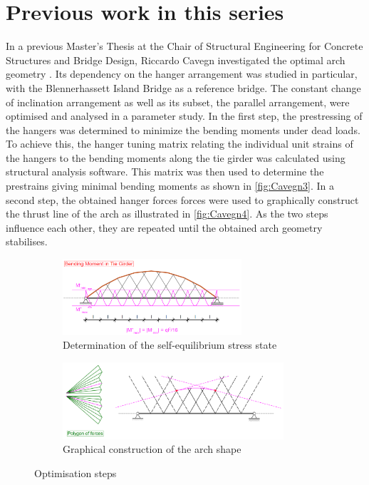 \section{Previous work in this series} \label{sec:rev_prev}
In a previous Master's Thesis at the Chair of Structural Engineering for Concrete Structures and Bridge Design, Riccardo Cavegn investigated the optimal arch geometry \cite{Cavegn}. Its dependency on the hanger arrangement was studied in particular, with the Blennerhassett Island Bridge as a reference bridge. The constant change of inclination arrangement as well as its subset, the parallel arrangement, were optimised and analysed in a parameter study. 
In the first step, the prestressing of the hangers was determined to minimize the bending moments under dead loads. To achieve this, the hanger tuning matrix relating the individual unit strains of the hangers to the bending moments along the tie girder was calculated using structural analysis software. This matrix was then used to determine the prestrains giving minimal bending moments as shown in \autoref{fig:Cavegn3}. In a second step, the obtained hanger forces forces were used to graphically construct the thrust line of the arch as illustrated in \autoref{fig:Cavegn4}. As the two steps influence each other, they are repeated until the obtained arch geometry stabilises.
\begin{figure}[H]
\centering
\begin{subfigure}{0.5\textwidth}
    \centering
    \includegraphics[width=0.73\textwidth]{Pictures/OptimizedBendingMoment.PNG}
    \caption{Determination of the self-equilibrium stress state}
    \label{fig:Cavegn3}
\end{subfigure}%
\begin{subfigure}{.5\textwidth}
    \centering
    \includegraphics[width=0.9\textwidth]{Pictures/GraphicalThrustLineConstruction.PNG}
    \caption{Graphical construction of the arch shape}
    \label{fig:Cavegn4}
\end{subfigure}
\caption{Optimisation steps \cite{Cavegn}}
\label{fig:Cavegn34}
\end{figure}
